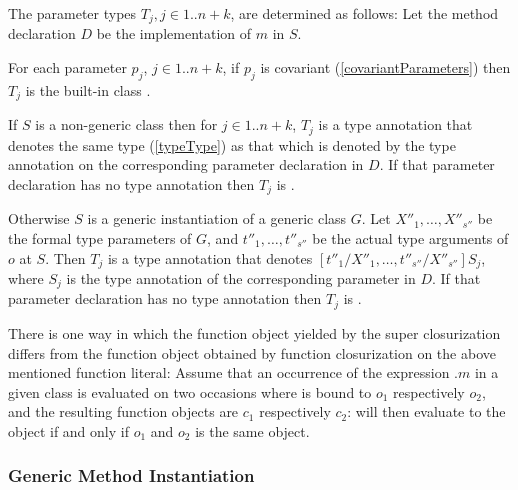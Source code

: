\documentclass[makeidx]{article}
\begin{document}
{\LMHash{}%
The parameter types $T_j, j \in 1 .. n+k$, are determined as follows:
Let the method declaration $D$ be the implementation of $m$ in $S$.

\LMHash{}%
For each parameter $p_j$, $j \in 1 .. n+k$, if $p_j$ is covariant
(\ref{covariantParameters})
then $T_j$ is the built-in class .


\LMHash{}%
If $S$ is a non-generic class then for $j \in 1 .. n+k$,
$T_j$ is a type annotation that denotes the same type
(\ref{typeType})
as that which is denoted by the type annotation on
the corresponding parameter declaration in $D$.
If that parameter declaration has no type annotation then $T_j$ is \DYNAMIC.

\LMHash{}%
Otherwise $S$ is a generic instantiation of a generic class $G$.
Let $X''_1, \ldots, X''_{s''}$ be the formal type parameters of $G$,
and $t''_1, \ldots, t''_{s''}$ be the actual type arguments of $o$ at $S$.
Then $T_j$ is a type annotation that denotes
$[t''_1/X''_1, \ldots, t''_{s''}/X''_{s''}]S_j$,
where $S_j$ is the type annotation of the corresponding parameter in $D$.
If that parameter declaration has no type annotation then $T_j$ is \DYNAMIC.

\LMHash{}%
There is one way in which
the function object yielded by the super closurization differs from
the function object obtained by function closurization on
the above mentioned function literal:
Assume that an occurrence of the expression \SUPER.$m$ in a given class
is evaluated on two occasions where \THIS{}
is bound to $o_1$ respectively $o_2$,
and the resulting function objects are $c_1$ respectively $c_2$:
 will then evaluate to the \TRUE{} object
if and only if $o_1$ and $o_2$ is the same object.


\subsubsection{Generic Method Instantiation}


}
\end{document}
